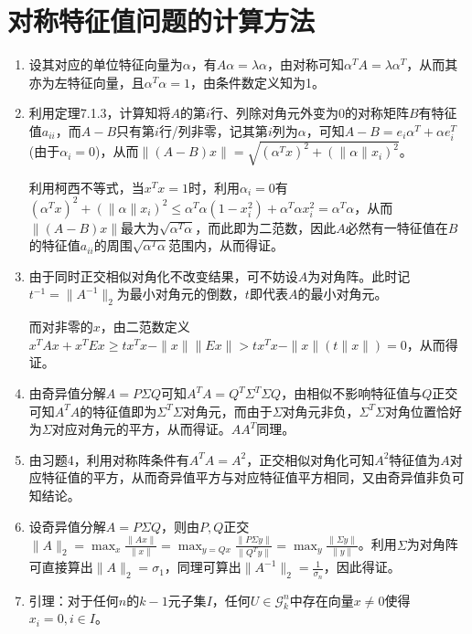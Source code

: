 \documentclass[a4paper,UTF8,fontset=windows]{ctexart}
\begin{document}
\section{对称特征值问题的计算方法}
\begin{enumerate}
\item
设其对应的单位特征向量为$\alpha$，有$A\alpha=\lambda\alpha$，由对称可知$\alpha^TA=\lambda\alpha^T$，从而其亦为左特征向量，且$\alpha^T\alpha=1$，由条件数定义知为1。

\item
利用定理7.1.3，计算知将$A$的第$i$行、列除对角元外变为0的对称矩阵$B$有特征值$a_{ii}$，而$A-B$只有第$i$行/列非零，记其第$i$列为$\alpha$，可知$A-B=e_i\alpha^T+\alpha e_i^T$(由于$\alpha_i=0$)，从而$\|(A-B)x\|=\sqrt{(\alpha^Tx)^2+(\|\alpha\|x_i)^2}$。

利用柯西不等式，当$x^Tx=1$时，利用$\alpha_i=0$有$(\alpha^Tx)^2+(\|\alpha\|x_i)^2\le \alpha^T\alpha(1-x_i^2)+\alpha^T\alpha x_i^2=\alpha^T\alpha$，从而$\|(A-B)x\|$最大为$\sqrt{\alpha^T\alpha}$，而此即为二范数，因此$A$必然有一特征值在$B$的特征值$a_{ii}$的周围$\sqrt{\alpha^T\alpha}$范围内，从而得证。

\item
由于同时正交相似对角化不改变结果，可不妨设$A$为对角阵。此时记$t^{-1}=\|A^{-1}\|_2$为最小对角元的倒数，$t$即代表$A$的最小对角元。

而对非零的$x$，由二范数定义$x^TAx+x^TEx\ge tx^Tx - \|x\|\|Ex\|>tx^Tx - \|x\|(t\|x\|)=0$，从而得证。

\item
由奇异值分解$A=P\Sigma Q$可知$A^TA=Q^T\Sigma^T\Sigma Q$，由相似不影响特征值与$Q$正交可知$A^TA$的特征值即为$\Sigma^T\Sigma$对角元，而由于$\Sigma$对角元非负，$\Sigma^T\Sigma$对角位置恰好为$\Sigma$对应对角元的平方，从而得证。$AA^T$同理。

\item
由习题4，利用对称阵条件有$A^TA=A^2$，正交相似对角化可知$A^2$特征值为$A$对应特征值的平方，从而奇异值平方与对应特征值平方相同，又由奇异值非负可知结论。

\item
设奇异值分解$A=P\Sigma Q$，则由$P,Q$正交$\|A\|_2=\max_x\frac{\|Ax\|}{\|x\|}=\max_{y=Qx}\frac{\|P\Sigma y\|}{\|Q^Ty\|}=\max_y\frac{\|\Sigma y\|}{\|y\|}$。利用$\Sigma$为对角阵可直接算出$\|A\|_2=\sigma_1$，同理可算出$\|A^{-1}\|_2=\frac{1}{\sigma_n}$，因此得证。

\item
引理：对于任何$n$的$k-1$元子集$I$，任何$U\in\mathcal{G}_k^n$中存在向量$x\ne0$使得$x_i=0,i\in I$。


\end{enumerate}
\end{document}
